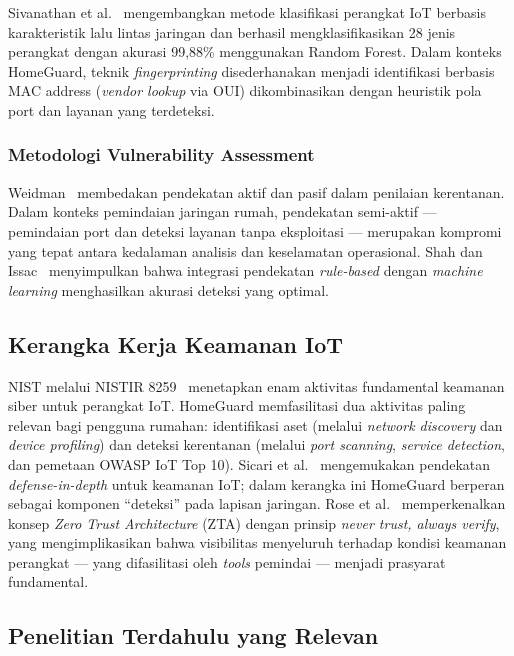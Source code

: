 \documentclass[conference]{IEEEtran}
\begin{document}
Sivanathan et al.\ \cite{sivanathan2019} mengembangkan metode klasifikasi
perangkat IoT berbasis karakteristik lalu lintas jaringan dan berhasil
mengklasifikasikan 28 jenis perangkat dengan akurasi 99,88\%
menggunakan Random Forest. Dalam konteks HomeGuard, teknik
\textit{fingerprinting} disederhanakan menjadi identifikasi berbasis MAC
address (\textit{vendor lookup} via OUI) dikombinasikan dengan heuristik
pola port dan layanan yang terdeteksi.

\subsubsection{Metodologi Vulnerability Assessment}

Weidman~\cite{weidman2014} membedakan pendekatan aktif dan pasif
dalam penilaian kerentanan. Dalam konteks pemindaian jaringan rumah,
pendekatan semi-aktif --- pemindaian port dan deteksi layanan tanpa
eksploitasi --- merupakan kompromi yang tepat antara kedalaman analisis
dan keselamatan operasional. Shah dan Issac~\cite{shah2018}
menyimpulkan bahwa integrasi pendekatan \textit{rule-based} dengan
\textit{machine learning} menghasilkan akurasi deteksi yang optimal.

\subsection{Kerangka Kerja Keamanan IoT}

NIST melalui NISTIR 8259~\cite{nist2020} menetapkan enam aktivitas
fundamental keamanan siber untuk perangkat IoT. HomeGuard memfasilitasi
dua aktivitas paling relevan bagi pengguna rumahan: identifikasi aset
(melalui \textit{network discovery} dan \textit{device profiling}) dan
deteksi kerentanan (melalui \textit{port scanning}, \textit{service
detection}, dan pemetaan OWASP IoT Top 10). Sicari et al.\
\cite{sicari2015} mengemukakan pendekatan \textit{defense-in-depth} untuk
keamanan IoT; dalam kerangka ini HomeGuard berperan sebagai komponen
``deteksi'' pada lapisan jaringan. Rose et al.\ \cite{rose2020}
memperkenalkan konsep \textit{Zero Trust Architecture} (ZTA) dengan
prinsip \textit{never trust, always verify}, yang mengimplikasikan bahwa
visibilitas menyeluruh terhadap kondisi keamanan perangkat --- yang
difasilitasi oleh \textit{tools} pemindai --- menjadi prasyarat fundamental.

\subsection{Penelitian Terdahulu yang Relevan}
\end{document}
